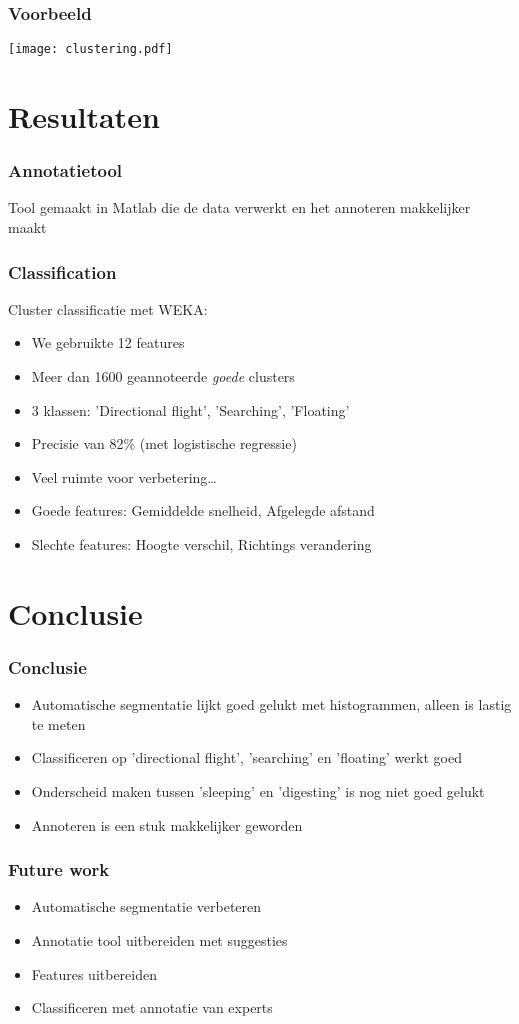 \documentclass{beamer}
\newcommand{\slide}[2]
{
\begin{frame}
\frametitle{#1} 

#2

\end{frame}
}
\begin{document}
\begin{frame}
\frametitle{Voorbeeld}
\texttt{[image: clustering.pdf]}
\end{frame}


\section{Resultaten}
\slide{Annotatietool}
{
	Tool gemaakt in Matlab die de data verwerkt en het annoteren makkelijker maakt
}

\slide{Classification}
{
Cluster classificatie met WEKA:
\begin{itemize}
    \item We gebruikte 12 features
    \item Meer dan 1600 geannoteerde \emph{goede} clusters
    \item 3 klassen: 'Directional flight', 'Searching', 'Floating'
    \item Precisie van 82\% (met logistische regressie)
    \item Veel ruimte voor verbetering\ldots
\end{itemize}
\vspace{1cm}
\begin{itemize}
\item Goede features: Gemiddelde snelheid, Afgelegde afstand
\item Slechte features: Hoogte verschil, Richtings verandering
\end{itemize}
}

\section{Conclusie}

\slide{Conclusie}
{
\begin{itemize}
	\item Automatische segmentatie lijkt goed gelukt met histogrammen, alleen is lastig te meten
	\item Classificeren op 'directional flight', 'searching' en 'floating' werkt goed
	\item Onderscheid maken tussen 'sleeping' en 'digesting' is nog niet goed gelukt
	\item Annoteren is een stuk makkelijker geworden
\end{itemize} 
}

\slide{Future work}
{
\begin{itemize}
	\item Automatische segmentatie verbeteren
	\item Annotatie tool uitbereiden met suggesties
	\item Features uitbereiden
	\item Classificeren met annotatie van experts
\end{itemize} 
}
\end{document}
